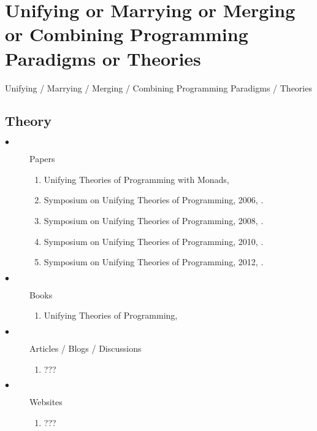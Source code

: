 \documentclass[proposal.tex]{subfiles}
\begin{document}
\section{Unifying or Marrying or Merging or Combining Programming Paradigms or Theories}\label{sect:ummcpp}

Unifying / Marrying / Merging / Combining Programming Paradigms / Theories
\subsection{Theory}
\begin{description}

\item[$\bullet$] Papers
\begin{enumerate}
\item Unifying Theories of Programming with Monads, \cite{gibbons2013unifying}

\item Symposium on Unifying Theories of Programming, 2006, \cite{DBLP:conf/utp/2006}.

\item Symposium on Unifying Theories of Programming, 2008, \cite{DBLP:conf/utp/2008}.

\item Symposium on Unifying Theories of Programming, 2010, \cite{DBLP:conf/utp/2010}.

\item Symposium on Unifying Theories of Programming, 2012, \cite{DBLP:conf/utp/2012}.

\end{enumerate}

\item[$\bullet$] Books
\begin{enumerate}
\item Unifying Theories of Programming, \cite{hoare1998unifying}
\end{enumerate}

\item[$\bullet$] Articles / Blogs / Discussions
\begin{enumerate}
\item ???
\end{enumerate}

\item[$\bullet$] Websites
\begin{enumerate}
\item ???
\end{enumerate}

\end{description}
\end{document}
